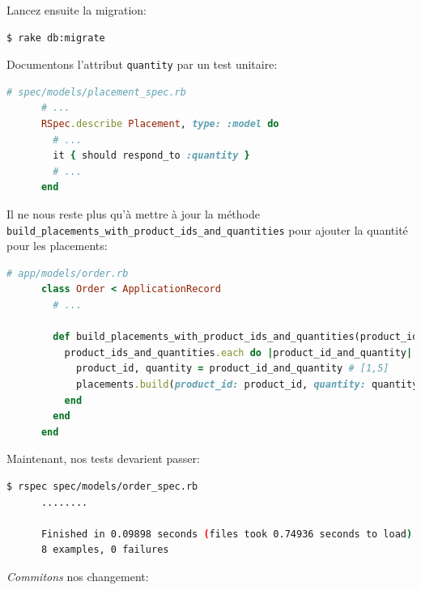 \documentclass[]{report}
\begin{document}
    Lancez ensuite la migration:

    \begin{scriptsize}
      \begin{lstlisting}[language=bash]
      $ rake db:migrate
      \end{lstlisting}
    \end{scriptsize}

    Documentons l'attribut \verb|quantity| par un test unitaire:

    \begin{scriptsize}
      \begin{lstlisting}[language=ruby]
      # spec/models/placement_spec.rb
      # ...
      RSpec.describe Placement, type: :model do
        # ...
        it { should respond_to :quantity }
        # ...
      end
      \end{lstlisting}
    \end{scriptsize}

    Il ne nous reste plus qu'à mettre à jour la méthode \verb|build_placements_with_product_ids_and_quantities| pour ajouter la quantité pour les placements:

    \begin{scriptsize}
      \begin{lstlisting}[language=ruby]
      # app/models/order.rb
      class Order < ApplicationRecord
        # ...

        def build_placements_with_product_ids_and_quantities(product_ids_and_quantities)
          product_ids_and_quantities.each do |product_id_and_quantity|
            product_id, quantity = product_id_and_quantity # [1,5]
            placements.build(product_id: product_id, quantity: quantity)
          end
        end
      end
      \end{lstlisting}
    \end{scriptsize}

    Maintenant, nos tests devarient passer:

    \begin{scriptsize}
      \begin{lstlisting}[language=bash]
      $ rspec spec/models/order_spec.rb
      ........

      Finished in 0.09898 seconds (files took 0.74936 seconds to load)
      8 examples, 0 failures
      \end{lstlisting}
    \end{scriptsize}

    \textit{Commitons} nos changement:
\end{document}
